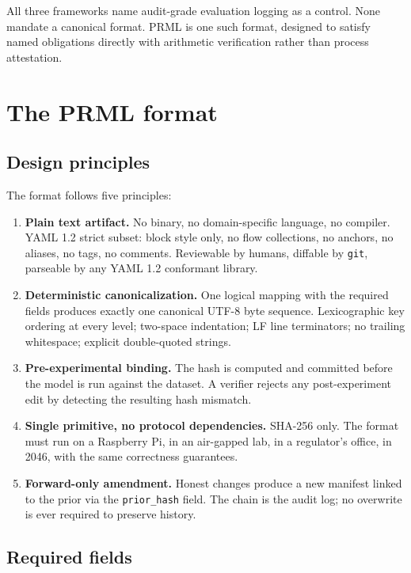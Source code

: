 \documentclass[11pt, a4paper]{article}
\begin{document}
All three frameworks name audit-grade evaluation logging as a control. None mandate a canonical format. PRML is one such format, designed to satisfy named obligations directly with arithmetic verification rather than process attestation.

\section{The PRML format}
\label{sec:format}

\subsection{Design principles}

The format follows five principles:

\begin{enumerate}[leftmargin=2em, itemsep=0.3em]
  \item \textbf{Plain text artifact.} No binary, no domain-specific language, no compiler. YAML 1.2 strict subset: block style only, no flow collections, no anchors, no aliases, no tags, no comments. Reviewable by humans, diffable by \texttt{git}, parseable by any YAML 1.2 conformant library.
  \item \textbf{Deterministic canonicalization.} One logical mapping with the required fields produces exactly one canonical UTF-8 byte sequence. Lexicographic key ordering at every level; two-space indentation; LF line terminators; no trailing whitespace; explicit double-quoted strings.
  \item \textbf{Pre-experimental binding.} The hash is computed and committed before the model is run against the dataset. A verifier rejects any post-experiment edit by detecting the resulting hash mismatch.
  \item \textbf{Single primitive, no protocol dependencies.} SHA-256 only. The format must run on a Raspberry Pi, in an air-gapped lab, in a regulator's office, in 2046, with the same correctness guarantees.
  \item \textbf{Forward-only amendment.} Honest changes produce a new manifest linked to the prior via the \texttt{prior\_hash} field. The chain is the audit log; no overwrite is ever required to preserve history.
\end{enumerate}

\subsection{Required fields}
\end{document}

